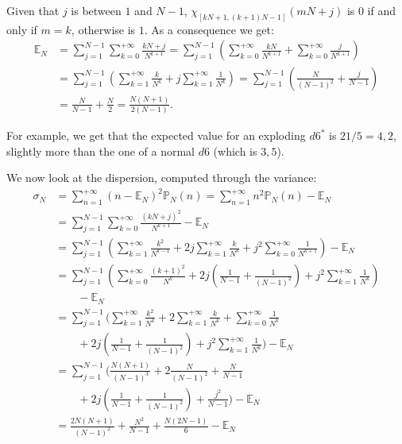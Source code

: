 \documentclass[a4paper,oneside,11pt]{book}
\renewcommand{\Pr}{\mathbb{P}}
\begin{document}
Given that $j$ is between $1$ and $N-1$, $\chi_{[kN+1,\left(k+1\right)N-1]}\left(mN+j\right)$ is $0$ if and only if $m=k$, otherwise is $1$. As a consequence we get:
\begin{align}
	\mathbb{E}_N&=\sum_{j=1}^{N-1}\sum_{k=0}^{+\infty}\frac{kN+j}{N^{k+1}}
	=\sum_{j=1}^{N-1}
	\left(
		\sum_{k=0}^{+\infty}\frac{kN}{N^{k+1}}
		+\sum_{k=0}^{+\infty}\frac{j}{N^{k+1}}
	\right)
\\
	&=\sum_{j=1}^{N-1}
	\left(
		\sum_{k=1}^{+\infty}\frac{k}{N^{k}}
		+j\sum_{k=1}^{+\infty}\frac1{N^k}
	\right)
	=\sum_{j=1}^{N-1}
	\left(
		\frac N{\left(N-1\right)^2}
		+\frac j{N-1}
	\right)
\\
	&=\frac N{N-1}
	+\frac N2
	=\frac{N\left(N+1\right)}{2\left(N-1\right)}.
\end{align}

For example, we get that the expected value for an exploding $d6^*$ is $21/5=4,2$, slightly more than the one of a normal $d6$ (which is $3,5$).

We now look at the dispersion, computed through the variance:
\begin{align}
  \sigma_N&=
  \sum_{n=1}^{+\infty}
  \left(n-\mathbb E_N\right)^2\Pr_N\left(n\right)
  =\sum_{n=1}^{+\infty}
  n^2\Pr_N\left(n\right)
  -\mathbb E_N
\\
  &=\sum_{j=1}^{N-1}
  \sum_{k=0}^{+\infty}
  \frac{\left(kN+j\right)^2}{N^{k+1}}
  -\mathbb E_N
\\
  &=\sum_{j=1}^{N-1}
  \left(
    \sum_{k=1}^{+\infty}
    \frac{k^2}{N^{k-1}}
    +2j\sum_{k=1}^{+\infty}
    \frac k{N^{k}}
    +j^2\sum_{k=0}^{+\infty}
    \frac1{N^{k+1}}
  \right)
  -\mathbb E_N
\\
  &=\sum_{j=1}^{N-1}
  \left(
    \sum_{k=0}^{+\infty}
    \frac{\left(k+1\right)^2}{N^k}
    +2j\left(
      \frac1{N-1}
      +\frac1{\left(N-1\right)^2}
    \right)
    +j^2\sum_{k=1}^{+\infty}
    \frac1{N^k}
  \right)
\\
  &\qquad
  -\mathbb E_N
\\
  &=\sum_{j=1}^{N-1}
  \bigg(
    \sum_{k=1}^{+\infty}
    \frac{k^2}{N^k}
    +2\sum_{k=1}^{+\infty}
    \frac k{N^k}
    +\sum_{k=0}^{+\infty}
    \frac1{N^k}
\\
  &\qquad+2j\left(
      \frac1{N-1}
      +\frac1{\left(N-1\right)^2}
    \right)
    +j^2\sum_{k=1}^{+\infty}
    \frac1{N^k}
  \bigg)
  -\mathbb E_N
\\
  &=\sum_{j=1}^{N-1}
  \bigg(
    \frac{N\left(N+1\right)}{\left(N-1\right)^3}
    +2\frac N{\left(N-1\right)^2}
    +\frac N{N-1}
\\
  &\qquad+2j\left(
      \frac1{N-1}
      +\frac1{\left(N-1\right)^2}
    \right)
    +\frac{j^2}{N-1}
  \bigg)
  -\mathbb E_N
\\
  &=\frac{2N\left(N+1\right)}{\left(N-1\right)^2}
  +\frac{N^2}{N-1}
  +\frac{N\left(2N-1\right)}6
  -\mathbb E_N
\end{align}
\end{document}
